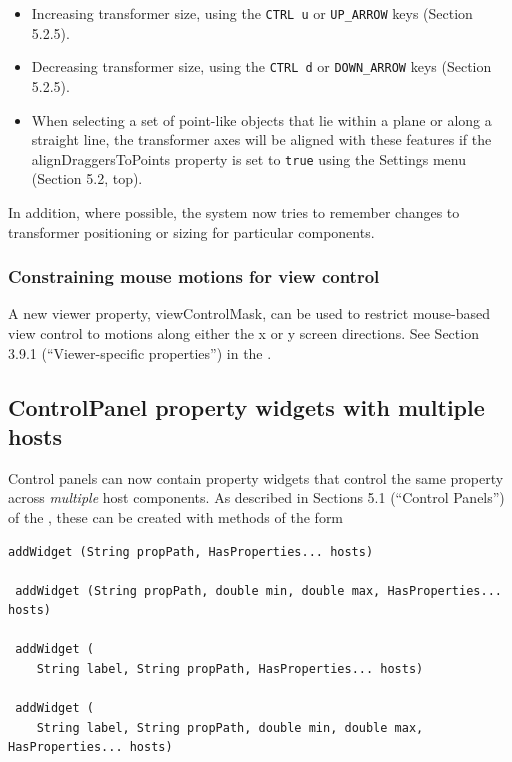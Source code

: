 \documentclass{article}
\begin{document}
\begin{itemize}
\item Increasing transformer size, using the {\tt CTRL u} or {\tt UP\_ARROW}
keys (Section 5.2.5).

\item Decreasing transformer size, using the {\tt CTRL d} or {\tt DOWN\_ARROW}
keys (Section 5.2.5).

\item When selecting a set of point-like objects that lie within a
plane or along a straight line, the transformer axes will be aligned
with these features if the {\sf alignDraggersToPoints} property is set
to {\tt true} using the {\sf Settings} menu (Section 5.2, top).

\end{itemize}

In addition, where possible, the system now tries to remember changes
to transformer positioning or sizing for particular components.

\subsubsection{Constraining mouse motions for view control}

A new viewer property, {\sf viewControlMask}, can be used to restrict
mouse-based view control to motions along either the x or y screen
directions.  See Section 3.9.1 (``Viewer-specific properties'') in the
.

\subsection*{ControlPanel property widgets with multiple hosts}

Control panels can now contain property widgets that control the same
property across {\it multiple} host components. As described in Sections 5.1
(``Control Panels'') of the , these can be created with methods of the form
%
\begin{lstlisting}[]
 addWidget (String propPath, HasProperties... hosts)

 addWidget (String propPath, double min, double max, HasProperties... hosts)

 addWidget (
    String label, String propPath, HasProperties... hosts)

 addWidget (
    String label, String propPath, double min, double max, HasProperties... hosts)
\end{lstlisting}
%
\end{document}
